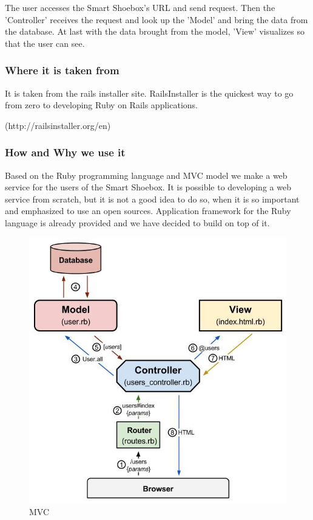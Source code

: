 \documentclass[conference]{IEEEtran}
\begin{document}
The user accesses the Smart Shoebox's URL and send request. Then the 'Controller' receives the request and look up the 'Model' and bring the data from the database. At last with the data brought from the model, 'View' visualizes so that the user can see.

\subsubsection{Where it is taken from}It is taken from the rails installer site. RailsInstaller is the quickest way to go from zero to developing Ruby on Rails applications. 
 
(http://railsinstaller.org/en)
\subsubsection{How and Why we use it} Based on the Ruby programming language and MVC model we make a web service for the users of the Smart Shoebox. It is possible to developing a web service from scratch, but it is not a good idea to do so, when it is so important and emphasized to use an open sources. Application framework for the Ruby language is already provided and we have decided to build on top of it.
\begin{figure}[H]
\begin{center}
    \includegraphics[scale=0.42]{mvc}
    \caption{MVC} \label{fig:label}
\end{center}
\end{figure}
\end{document}
